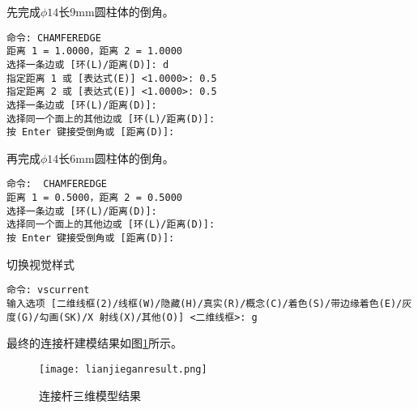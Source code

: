 \begin{procedure}
先完成$\phi 14$长9mm圆柱体的倒角。
\begin{lstlisting}
命令: CHAMFEREDGE
距离 1 = 1.0000，距离 2 = 1.0000
选择一条边或 [环(L)/距离(D)]: d
指定距离 1 或 [表达式(E)] <1.0000>: 0.5
指定距离 2 或 [表达式(E)] <1.0000>: 0.5
选择一条边或 [环(L)/距离(D)]:
选择同一个面上的其他边或 [环(L)/距离(D)]:
按 Enter 键接受倒角或 [距离(D)]:
\end{lstlisting}
再完成$\phi 14$长6mm圆柱体的倒角。
\begin{lstlisting}
命令:  CHAMFEREDGE
距离 1 = 0.5000，距离 2 = 0.5000
选择一条边或 [环(L)/距离(D)]:
选择同一个面上的其他边或 [环(L)/距离(D)]:
按 Enter 键接受倒角或 [距离(D)]:
\end{lstlisting}
\item 切换视觉样式
\begin{lstlisting}
命令: vscurrent
输入选项 [二维线框(2)/线框(W)/隐藏(H)/真实(R)/概念(C)/着色(S)/带边缘着色(E)/灰度(G)/勾画(SK)/X 射线(X)/其他(O)] <二维线框>: g
\end{lstlisting}

最终的连接杆建模结果如图\ref{fig:lianjieganresult}所示。
\begin{figure}[htbp]
\centering
\texttt{[image: lianjieganresult.png]}
\caption{连接杆三维模型结果}\label{fig:lianjieganresult}
\end{figure}
\end{procedure}
\endinput